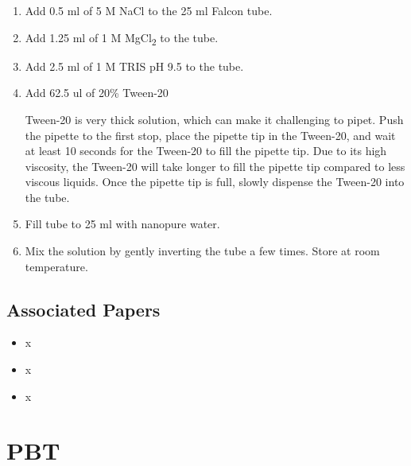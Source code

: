 \documentclass[
  letterpaper,
  DIV=11,
  numbers=noendperiod]{scrreprt}
\providecommand{\tightlist}{%
  \setlength{\itemsep}{0pt}\setlength{\parskip}{0pt}}\usepackage{longtable,booktabs,array}
\begin{document}
\begin{enumerate}
\def\labelenumi{\arabic{enumi}.}
\item
  Add 0.5 ml of 5 M NaCl to the 25 ml Falcon tube.
\item
  Add 1.25 ml of 1 M MgCl\textsubscript{2} to the tube.
\item
  Add 2.5 ml of 1 M TRIS pH 9.5 to the tube.
\item
  Add 62.5 ul of 20\% Tween-20

  \begin{tcolorbox}[enhanced jigsaw, rightrule=.15mm, title=\textcolor{quarto-callout-important-color}{\faExclamation}\hspace{0.5em}{NOTE}, titlerule=0mm, opacitybacktitle=0.6, toprule=.15mm, bottomrule=.15mm, opacityback=0, left=2mm, colframe=quarto-callout-important-color-frame, breakable, coltitle=black, colback=white, colbacktitle=quarto-callout-important-color!10!white, bottomtitle=1mm, leftrule=.75mm, toptitle=1mm, arc=.35mm]

  Tween-20 is very thick solution, which can make it challenging to
  pipet. Push the pipette to the first stop, place the pipette tip in
  the Tween-20, and wait at least 10 seconds for the Tween-20 to fill
  the pipette tip. Due to its high viscosity, the Tween-20 will take
  longer to fill the pipette tip compared to less viscous liquids. Once
  the pipette tip is full, slowly dispense the Tween-20 into the tube.

  \end{tcolorbox}
\item
  Fill tube to 25 ml with nanopure water.
\item
  Mix the solution by gently inverting the tube a few times. Store at
  room temperature.
\end{enumerate}

\hypertarget{associated-papers-76}{%
\section{Associated Papers}\label{associated-papers-76}}

\begin{itemize}
\tightlist
\item
  x
\item
  x
\item
  x
\end{itemize}

\hypertarget{sec-recipe-pbt}{%
\chapter{PBT}\label{sec-recipe-pbt}}
\end{document}
